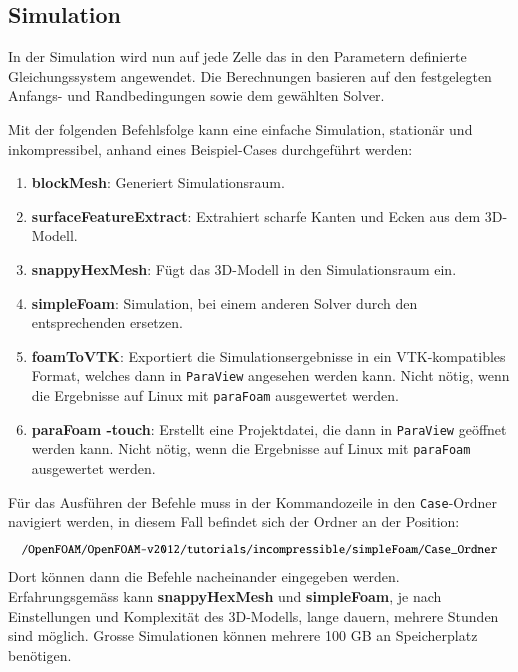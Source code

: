 

\subsection{Simulation \label{openfoam:section:Simulation}}
In der Simulation wird nun auf jede Zelle das in den Parametern definierte Gleichungssystem angewendet.
Die Berechnungen basieren auf den festgelegten Anfangs- und Randbedingungen sowie dem gewählten Solver.

Mit der folgenden Befehlsfolge kann eine einfache Simulation, stationär und inkompressibel, anhand eines Beispiel-Cases durchgeführt werden:

\begin{enumerate}
    \item \textbf{blockMesh}: Generiert Simulationsraum.
    \item \textbf{surfaceFeatureExtract}: Extrahiert scharfe Kanten und Ecken aus dem 3D-Modell.
    \item \textbf{snappyHexMesh}: Fügt das 3D-Modell in den Simulationsraum ein.
    \item \textbf{simpleFoam}: Simulation, bei einem anderen Solver durch den entsprechenden ersetzen.
    \item \textbf{foamToVTK}:
    Exportiert die Simulationsergebnisse in ein VTK-kompatibles Format, welches dann in \texttt{ParaView} angesehen werden kann.
Nicht nötig, wenn die Ergebnisse auf Linux mit \texttt{paraFoam} ausgewertet werden.
    \item \textbf{paraFoam -touch}:
    Erstellt eine Projektdatei, die dann in \texttt{ParaView} geöffnet werden kann.
Nicht nötig, wenn die Ergebnisse auf Linux mit \texttt{paraFoam} ausgewertet werden.
\end{enumerate}

Für das Ausführen der Befehle muss in der Kommandozeile in den \texttt{Case}-Ordner navigiert werden, in diesem Fall befindet sich der Ordner an der Position:
\[
\small\texttt{/OpenFOAM/OpenFOAM-v2012/tutorials/incompressible/simpleFoam/Case\_Ordner}
\]
Dort können dann die Befehle nacheinander eingegeben werden.
Erfahrungsgemäss kann \textbf{snappyHexMesh} und \textbf{simpleFoam}, je nach Einstellungen und Komplexität des 3D-Mo\-dells, 
lange dauern, mehrere Stunden sind möglich.
Grosse Simulationen können mehrere 100 GB an Speicherplatz benötigen.

